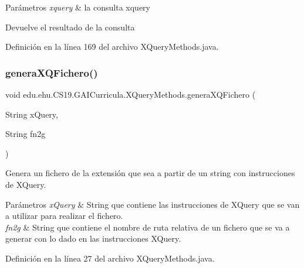 \begin{DoxyParams}{Parámetros}
{\em xquery} & la consulta xquery\\
\hline
\end{DoxyParams}
\begin{DoxyReturn}{Devuelve}
el resultado de la consulta 
\end{DoxyReturn}


Definición en la línea 169 del archivo X\+Query\+Methods.\+java.

\mbox{\label{a00032_a7d2040d47b8350ca48da7ce5b658fab2}} 
\subsubsection{\texorpdfstring{generaXQFichero()}{generaXQFichero()}}
{\footnotesize\ttfamily void edu.\+ehu.\+C\+S19.\+G\+A\+I\+Curricula.\+X\+Query\+Methods.\+genera\+X\+Q\+Fichero (\begin{DoxyParamCaption}\item[{String}]{x\+Query,  }\item[{String}]{fn2g }\end{DoxyParamCaption})}



Genera un fichero de la extensión que sea a partir de un string con instrucciones de X\+Query. 


\begin{DoxyParams}{Parámetros}
{\em x\+Query} & String que contiene las instrucciones de X\+Query que se van a utilizar para realizar el fichero. \\
\hline
{\em fn2g} & String que contiene el nombre de ruta relativa de un fichero que se va a generar con lo dado en las instrucciones X\+Query. \\
\hline
\end{DoxyParams}


Definición en la línea 27 del archivo X\+Query\+Methods.\+java.

\mbox{\label{a00032_ae60f32c5f8b4ffe3f2bdd1f44976eacf}} 
